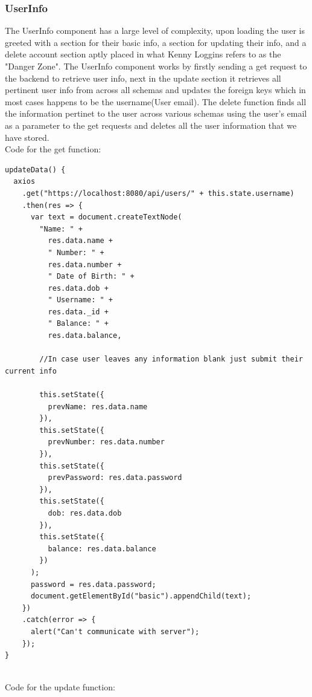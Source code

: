 \subsubsection{UserInfo}
The UserInfo component has a large level of complexity, upon loading the user is
greeted with a section for their basic info, a section for updating their info,
and a delete account section aptly placed in what Kenny Loggins refers to as the "Danger Zone".
The UserInfo component works by firstly sending a get request to the backend to retrieve user info,
next in the update section it retrieves all pertinent user info from across all schemas and
updates the foreign keys which in most cases happens to be the username(User email).  The delete function
finds all the information pertinet to the user across various schemas using the user's email as
a parameter to the get requests and deletes all the user information that we have stored.
\\
Code for the get function:
\begin{verbatim}
updateData() {
  axios
    .get("https://localhost:8080/api/users/" + this.state.username)
    .then(res => {
      var text = document.createTextNode(
        "Name: " +
          res.data.name +
          " Number: " +
          res.data.number +
          " Date of Birth: " +
          res.data.dob +
          " Username: " +
          res.data._id +
          " Balance: " +
          res.data.balance,

        //In case user leaves any information blank just submit their current info

        this.setState({
          prevName: res.data.name
        }),
        this.setState({
          prevNumber: res.data.number
        }),
        this.setState({
          prevPassword: res.data.password
        }),
        this.setState({
          dob: res.data.dob
        }),
        this.setState({
          balance: res.data.balance
        })
      );
      password = res.data.password;
      document.getElementById("basic").appendChild(text);
    })
    .catch(error => {
      alert("Can't communicate with server");
    });
}
\end{verbatim}
\\
Code for the update function:
